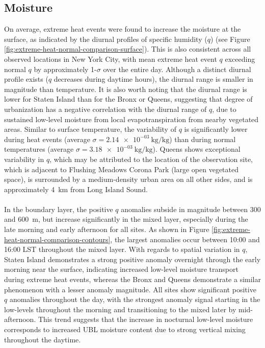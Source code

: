 \FloatBarrier

\subsection{Moisture}
On average, extreme heat events were found to increase the moisture at the surface, as indicated by the diurnal profiles of specific humidity ($q$) (see Figure \ref{fig:extreme-heat-normal-comparison-surface}). This is also consistent across all observed locations in New York City, with mean extreme heat event $q$ exceeding normal $q$ by approximately 1-$\sigma$ over the entire day. Although a distinct diurnal profile exists ($q$ decreases during daytime hours), the diurnal range is smaller in magnitude than temperature. It is also worth noting that the diurnal range is lower for Staten Island than for the Bronx or Queens, suggesting that degree of urbanization has a negative correlation with the diurnal range of $q$, due to sustained low-level moisture from local evapotranspiration from nearby vegetated areas. Similar to surface temperature, the variability of $q$ is significantly lower during heat events (average $ \sigma = \SI{2.14e-03}{\kilo\gram\per\kilo\gram} $) than during normal temperatures (average $ \sigma = \SI{3.18e-03}{\kilo\gram\per\kilo\gram} $). Queens shows exceptional variability in $q$, which may be attributed to the location of the observation site, which is adjacent to Flushing Meadows Corona Park (large open vegetated space), is surrounded by a medium-density urban area on all other sides, and is approximately \SI{4}{\kilo\meter} from Long Island Sound. 
\\ \\
In the boundary layer, the positive $q$ anomalies subside in magnitude between 300 and \SI{600}{\meter}, but increase significantly in the mixed layer, especially during the late morning and early afternoon for all sites. As shown in Figure \ref{fig:extreme-heat-normal-comparison-contours}, the largest anomalies occur between 10:00 and 16:00 LST throughout the mixed layer. With regards to spatial variation in $q$, Staten Island demonstrates a strong positive anomaly overnight through the early morning near the surface, indicating increased low-level moisture transport during extreme heat events, whereas the Bronx and Queens demonstrate a similar phenomenon with a lesser anomaly magnitude. All sites show significant positive $q$ anomalies throughout the day, with the strongest anomaly signal starting in the low-levels throughout the morning and transitioning to the mixed later by mid-afternoon. This trend suggests that the increase in nocturnal low-level moisture corresponds to increased UBL moisture content due to strong vertical mixing throughout the daytime.
